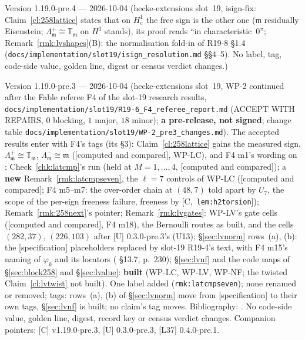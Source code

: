\documentclass[11pt]{article}
\theoremstyle{remark}
\newcommand{\T}{\mathbb{T}}
\newcommand{\m}{\mathfrak{m}}
\newcommand{\HA}[1]{[C,~\texttt{#1}]}      %
\newcommand{\CMPD}{\textsf{[computed and compared]}}   %
\newcommand{\SPEC}{\textsf{[specification]}}           %
\begin{document}
Version 1.19.0-pre.4 --- 2026-10-04 (hecke-extensions slot~19, isign-fix: Claim~\ref{cl:258lattice} states that on $H^{1}_c$ the free sign is the other one ($\m$ residually Eisenstein; $\Lambda_\m^{+}\cong\T_\m$ on $H^{1}$ stands), its proof reads ``in characteristic~$0$''; Remark~\ref{rmk:lvshapes}(B): the normalisation fold-in of R19-8 \S1.4 (\texttt{docs/implementation/slot19/isign\_resolution.md} \S\S4--5). No label, tag, code-side value, golden line, digest or census verdict changes.)

Version 1.19.0-pre.3 --- 2026-10-04 (hecke-extensions slot~19, WP-2 continued after the Fable referee F4 of the slot-19 research results,
\texttt{docs/implementation/slot19/R19-6\_F4\_referee\_report.md} (ACCEPT WITH REPAIRS, $0$ blocking, $1$ major, $18$ minor); \textbf{a pre-release, not signed};
change table \texttt{docs/implementation/slot19/WP-2\_pre3\_changes.md}). The accepted results enter with F4's tags (its \S3): Claim~\ref{cl:258lattice} gains the
measured sign, $\Lambda_\m^{+}\cong\T_\m$, $\Lambda_\m^{-}\cong\m$ (\CMPD, WP-LC), and F4 m1's wording on \cite{bass_ubiquity}; Check~\ref{chk:latcmp}'s run (held at
$M=1,\dots,4$, \CMPD); a \textbf{new} Remark~\ref{rmk:latcmpseven}, the $\ell=7$ controls of WP-LC (\CMPD; F4 m5--m7: the over-order chain at $(48,7)$ told apart by
$U_7$, the scope of the per-sign freeness failure, freeness by \HA{lem:h2torsion}); Remark~\ref{rmk:258next}'s pointer; Remark~\ref{rmk:lvgates}: WP-LV's gate cells
(\CMPD, F4 m18), the Bernoulli routes as built, and the cells $(282,37)$, $(226,103)$ after [U] 0.3.0-pre.3's (U13); \S\ref{sec:lvnorm} rows~(a), (b): the
\SPEC{} placeholders replaced by slot-19 R19-4's text, with F4 m15's naming of $\varphi_k$ and its locators (\cite{washington1st} \S13.7, \cite{coates_wiles} p.~230);
\S\ref{sec:lvnf} and the code maps of \S\ref{sec:block258} and \S\ref{sec:lvalue}: \textbf{built} (WP-LC, WP-LV, WP-NF; the twisted Claim~\ref{cl:lvtwist} not built).
One label added (\texttt{rmk:latcmpseven}); none renamed or removed; tags: rows~(a), (b) of \S\ref{sec:lvnorm} move from \SPEC{} to their own tags, \S\ref{sec:lvnf} is
built; no claim's tag moves. Bibliography: \cite{coates_wiles}. No code-side value, golden line, digest, record key or census verdict changes. Companion pointers: [C]
v1.19.0-pre.3, [U] 0.3.0-pre.3, [L37] 0.4.0-pre.1.
\end{document}
